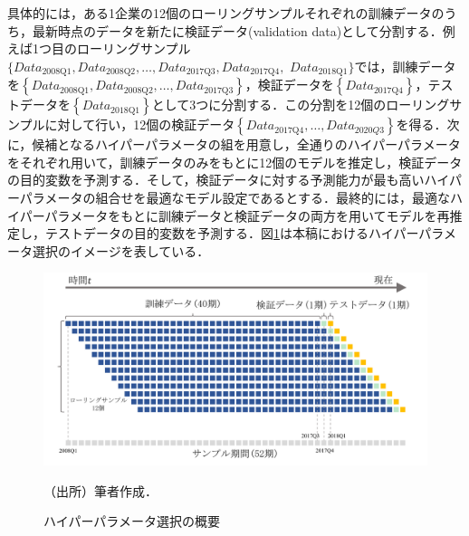 \documentclass[a4paper，11pt]{jsarticle}
\begin{document}
具体的には，ある1企業の12個のローリングサンプルそれぞれの訓練データのうち，最新時点のデータを新たに検証データ(validation data)として分割する．例えば1つ目のローリングサンプル$\{Data_{\text{2008Q1}}, Data_{\text{2008Q2}}, \ldots, Data_{\text{2017Q3}}, Data_{\text{2017Q4}},$ $Data_{\text{2018Q1}}\}$では，訓練データを$\left\{Data_{\text{2008Q1}}, Data_{\text{2008Q2}}, \ldots, Data_{\text{2017Q3}}\right\}$，検証データを$\left\{Data_{\text{2017Q4}}\right\}$，テストデータを$\left\{Data_{\text{2018Q1}}\right\}$として3つに分割する．この分割を12個のローリングサンプルに対して行い，12個の検証データ$\left\{Data_{\text{2017Q4}}, \ldots , Data_{2020Q3}\right\}$を得る．次に，候補となるハイパーパラメータの組を用意し，全通りのハイパーパラメータをそれぞれ用いて，訓練データのみをもとに12個のモデルを推定し，検証データの目的変数を予測する．そして，検証データに対する予測能力が最も高いハイパーパラメータの組合せを最適なモデル設定であるとする．最終的には，最適なハイパーパラメータをもとに訓練データと検証データの両方を用いてモデルを再推定し，テストデータの目的変数を予測する．図\ref{fig:hyparam_selection}は本稿におけるハイパーパラメータ選択のイメージを表している．


\begin{figure}[tbp]
  \centering
  \caption{ハイパーパラメータ選択の概要}
  \label{fig:hyparam_selection}
  \includegraphics[width=0.8\linewidth]{./img/_rolling_sample_val.pdf}
  \begin{threeparttable}
  \begin{tablenotes}
    \item[]（出所）筆者作成．
  \end{tablenotes}
  \end{threeparttable}
\end{figure}

\end{document}
